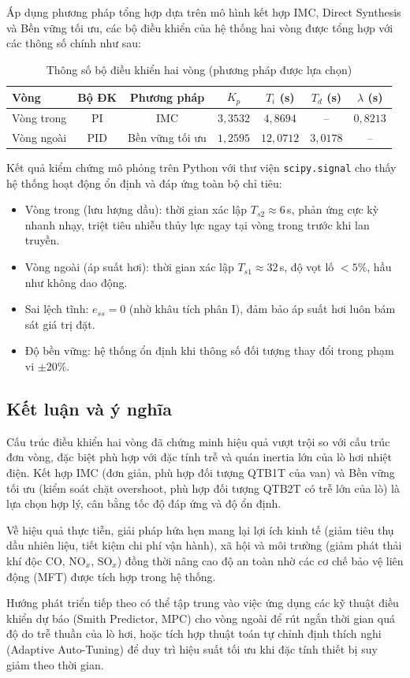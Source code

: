 \documentclass[../main.tex]{subfiles}
\begin{document}
Áp dụng phương pháp tổng hợp dựa trên mô hình kết hợp IMC, Direct Synthesis và Bền vững tối ưu, các bộ điều khiển của hệ thống hai vòng được tổng hợp với các thông số chính như sau:

\begin{table}[htbp]
\centering
\caption{Thông số bộ điều khiển hai vòng (phương pháp được lựa chọn)}
\label{tab:controller_params}
\begin{tabular}{|l|c|c|c|c|c|c|}
\hline
\textbf{Vòng} & \textbf{Bộ ĐK} & \textbf{Phương pháp} & $K_p$ & $T_i$ (s) & $T_d$ (s) & $\lambda$ (s) \\
\hline
Vòng trong & PI & IMC & $3{,}3532$ & $4{,}8694$ & -- & $0{,}8213$ \\
\hline
Vòng ngoài & PID & Bền vững tối ưu & $1{,}2595$ & $12{,}0712$ & $3{,}0178$ & -- \\
\hline
\end{tabular}
\end{table}

Kết quả kiểm chứng mô phỏng trên Python với thư viện \texttt{scipy.signal} cho thấy hệ thống hoạt động ổn định và đáp ứng toàn bộ chỉ tiêu:

\begin{itemize}
    \item Vòng trong (lưu lượng dầu): thời gian xác lập $T_{s2} \approx 6$\,s, phản ứng cực kỳ nhanh nhạy, triệt tiêu nhiễu thủy lực ngay tại vòng trong trước khi lan truyền.
    \item Vòng ngoài (áp suất hơi): thời gian xác lập $T_{s1} \approx 32$\,s, độ vọt lố $< 5\%$, hầu như không dao động.
    \item Sai lệch tĩnh: $e_{ss} = 0$ (nhờ khâu tích phân I), đảm bảo áp suất hơi luôn bám sát giá trị đặt.
    \item Độ bền vững: hệ thống ổn định khi thông số đối tượng thay đổi trong phạm vi $\pm 20\%$.
\end{itemize}

\subsection{Kết luận và ý nghĩa}

Cấu trúc điều khiển hai vòng đã chứng minh hiệu quả vượt trội so với cấu trúc đơn vòng, đặc biệt phù hợp với đặc tính trễ và quán inertia lớn của lò hơi nhiệt điện. Kết hợp IMC (đơn giản, phù hợp đối tượng QTB1T của van) và Bền vững tối ưu (kiểm soát chặt overshoot, phù hợp đối tượng QTB2T có trễ lớn của lò) là lựa chọn hợp lý, cân bằng tốc độ đáp ứng và độ ổn định.

Về hiệu quả thực tiễn, giải pháp hứa hẹn mang lại lợi ích kinh tế (giảm tiêu thụ dầu nhiên liệu, tiết kiệm chi phí vận hành), xã hội và môi trường (giảm phát thải khí độc CO, NO$_x$, SO$_x$) đồng thời nâng cao độ an toàn nhờ các cơ chế bảo vệ liên động (MFT) được tích hợp trong hệ thống.

Hướng phát triển tiếp theo có thể tập trung vào việc ứng dụng các kỹ thuật điều khiển dự báo (Smith Predictor, MPC) cho vòng ngoài để rút ngắn thời gian quá độ do trễ thuần của lò hơi, hoặc tích hợp thuật toán tự chỉnh định thích nghi (Adaptive Auto-Tuning) để duy trì hiệu suất tối ưu khi đặc tính thiết bị suy giảm theo thời gian.
\end{document}
